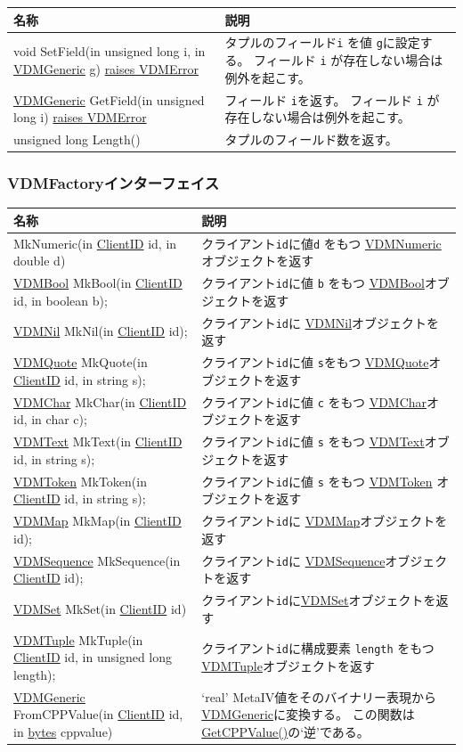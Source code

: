 \documentclass[\pformat,12pt]{jarticle}
\newcommand{\pbs}[1]{\let\temp=\\#1\let\\=\temp}
\newenvironment{interfacetable}{%
  \begin{longtable}{|>{\pbs\raggedright\ttfamily}p{6.6cm}%
                    |>{\pbs\raggedright}p{6.6cm}|} \hline
  \textrm{\bfseries 名称} &  \textbf{説明} \\ \hline
  \endhead
  }{\end{longtable}}
\newcommand{\VDMError}{\hyperlink{exception.VDMError}{raises VDMError}}
\newcommand{\VDMGeneric}{\hyperlink{interface.Generic}{VDMGeneric}}
\newcommand{\ClientID}{\hyperlink{type.ClientID}{ClientID}}
\newcommand{\bytes}{\hyperlink{type.bytes}{bytes}}
\newcommand{\VDMBool}{\hyperlink{interface.VDMBool}{VDMBool}}
\newcommand{\VDMChar}{\hyperlink{interface.VDMChar}{VDMChar}}
\newcommand{\VDMNumeric}{\hyperlink{interface.VDMNumeric}{VDMNumeric}}
\newcommand{\VDMQuote}{\hyperlink{interface.VDMQuote}{VDMQuote}}
\newcommand{\VDMText}{\hyperlink{interface.VDMText}{VDMText}}
\newcommand{\VDMToken}{\hyperlink{interface.VDMToken}{VDMToken}}
\newcommand{\VDMNil}{\hyperlink{interface.VDMNil}{VDMNil}}
\newcommand{\VDMMap}{\hyperlink{interface.VDMMap}{VDMMap}}
\newcommand{\VDMSequence}{\hyperlink{interface.VDMSequence}{VDMSequence}}
\newcommand{\VDMSet}{\hyperlink{interface.VDMSet}{VDMSet}}
\newcommand{\VDMTuple}{\hyperlink{interface.VDMTuple}{VDMTuple}}
\begin{document}
\begin{interfacetable}
void SetField(in unsigned long i, in {\VDMGeneric} g) {\VDMError}
 & タプルのフィールド\texttt{i} を値 \texttt{g}に設定する。
   フィールド \texttt{i} が存在しない場合は例外を起こす。
\\ \hline
{\VDMGeneric} GetField(in unsigned long i) {\VDMError}
 & フィールド \texttt{i}を返す。
    フィールド \texttt{i} が存在しない場合は例外を起こす。
\\ \hline
unsigned long Length() 
 & タプルのフィールド数を返す。
\\ \hline
\end{interfacetable}

\subsubsection{VDMFactoryインターフェイス}
\mbox{}
\begin{interfacetable}
{\VDMNumeric} MkNumeric(in {\ClientID} id, in double d)
  & クライアント\texttt{id}に値\texttt{d} をもつ {\VDMNumeric} オブジェクトを返す \\ \hline
{\VDMBool} MkBool(in {\ClientID} id, in boolean b);
  & クライアント\texttt{id}に値 \texttt{b} をもつ  {\VDMBool}オブジェクトを返す \\ \hline
{\VDMNil} MkNil(in {\ClientID} id);
  & クライアント\texttt{id}に  {\VDMNil}オブジェクトを返す 
 \\ \hline
{\VDMQuote} MkQuote(in {\ClientID} id, in string s);
  & クライアント\texttt{id}に値 \texttt{s}をもつ  {\VDMQuote}オブジェクトを返す  \\ \hline
{\VDMChar}  MkChar(in {\ClientID} id, in char c);
  & クライアント\texttt{id}に値 \texttt{c} をもつ  {\VDMChar}オブジェクトを返す  \\ \hline
{\VDMText}  MkText(in {\ClientID} id, in string s);
  & クライアント\texttt{id}に値  \texttt{s} をもつ {\VDMText}オブジェクトを返す  \\ \hline
{\VDMToken}  MkToken(in {\ClientID} id, in string s);
  & クライアント\texttt{id}に値  \texttt{s} をもつ  {\VDMToken} オブジェクトを返す 
 \\ \hline
{\VDMMap}  MkMap(in {\ClientID} id);
  & クライアント\texttt{id}に {\VDMMap}オブジェクトを返す 
 \\ \hline
{\VDMSequence}  MkSequence(in {\ClientID} id);
  & クライアント\texttt{id}に {\VDMSequence}オブジェクトを返す 
 \\ \hline
{\VDMSet}  MkSet(in {\ClientID} id) 
  & クライアント\texttt{id}に{\VDMSet}オブジェクトを返す 
 \\ \hline
{\VDMTuple} MkTuple(in {\ClientID} id, in unsigned long length);
  & クライアント\texttt{id}に構成要素 \texttt{length} をもつ{\VDMTuple}オブジェクトを返す 
\\ \hline
{\VDMGeneric}  FromCPPValue(in {\ClientID} id, in {\bytes} cppvalue)
  & `real' MetaIV値をそのバイナリー表現から{\VDMGeneric}に変換する。
 この関数は
    \hyperlink{method.VDMGenericGetCPPValue}{GetCPPValue()}の`逆'である。 \\ \hline
\end{interfacetable}
\end{document}
